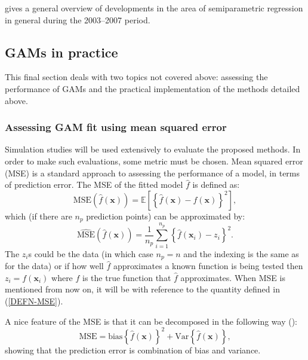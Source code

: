 \cite{ruppertreview} gives a general overview of developments in the area of semiparametric regression in general during the 2003--2007 period.




\subsection{GAMs in practice}

This final section deals with two topics not covered above: assessing the performance of GAMs and the practical implementation of the methods detailed above.

\subsubsection{Assessing GAM fit using mean squared error}

Simulation studies will be used extensively to evaluate the proposed methods. In order to make such evaluations, some metric must be chosen. Mean squared error (MSE) is a standard approach to assessing the performance of a model, in terms of prediction error. The MSE of the fitted model $\hat{f}$ is defined as:
\begin{equation*}
\text{MSE}(\hat{f}(\mathbf{x})) = \mathbb{E}\left [\left \{ \hat{f}(\mathbf{x}) - f(\mathbf{x}) \right \}^2 \right ],
\end{equation*}
which (if there are $n_p$ prediction points) can be approximated by:
\begin{equation}
\hat{\text{MSE}}(\hat{f}(\mathbf{x})) = \frac{1}{n_p} \sum_{i=1}^{n_p} \left \{\hat{f}(\mathbf{x}_i) - z_i \right \}^2.
\label{DEFN-MSE}
\end{equation}
The $z_i$s could be the data (in which case $n_p=n$ and the indexing is the same as for the data) or if how well $\hat{f}$ approximates a known function is being tested then $z_i=f(\mathbf{x}_i)$ where $f$ is the true function that $\hat{f}$ approximates. When MSE is mentioned from now on, it will be with reference to the quantity defined in (\ref{DEFN-MSE}).

A nice feature of the MSE is that it can be decomposed in the following way (\cite[p. 24]{elements}):
\begin{equation*}
\text{MSE} = \text{bias} \left \{ \hat{f}(\mathbf{x})\right \}^2 + \text{Var}\left\{\hat{f}(\mathbf{x}) \right \},
\end{equation*}
showing that the prediction error is combination of bias and variance.


